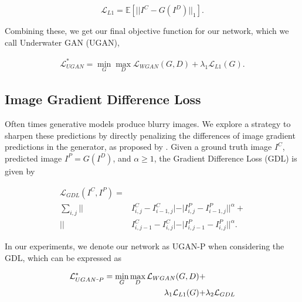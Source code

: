 \begin{equation}
   \mathcal{L}_{L1} = \mathbb{E} [ || I^C - G(I^D) ||_1 ].
\end{equation}

\noindent Combining these, we get our final objective function for our network, which we call Underwater GAN (UGAN),

\begin{equation}
   \begin{aligned}
      \mathcal{L}_{UGAN}^* = \min\limits_{G}\max\limits_{D} \mathcal{L}_{WGAN}(G,D) + \lambda_{1} \mathcal{L}_{L1}(G).
   \end{aligned}
\end{equation}


\subsection{Image Gradient Difference Loss}
Often times generative models produce blurry images. We explore a strategy to sharpen these predictions by
directly penalizing the differences of image gradient predictions in the generator, as proposed by
\cite{mathieu2015deep}. Given a ground truth image $I^C$, predicted image $I^P = G(I^D)$, and $\alpha \geq 1$, the
Gradient Difference Loss (GDL) is given by

\begin{equation}
   \begin{aligned}
      \mathcal{L}_{GDL}(I^C, I^P) = \\ \sum\limits_{i,j} || & I^C_{i,j} - I^C_{i-1,j}| - | I^P_{i,j} - I^P_{i-1,j}||^{\alpha} + \\
      || & I^C_{i,j-1} - I^C_{i,j}| - | I^P_{i,j-1} - I^P_{i,j}||^{\alpha}.
   \end{aligned}
   \label{gdl_eq}
\end{equation}

\noindent In our experiments, we denote our network as UGAN-P when considering the GDL, which can be expressed as

\begin{equation}
   \begin{aligned}
      \mathcal{L}_{UGAN\scalebox{0.4}[1.0]{\( - \)}P}^* = \min\limits_{G}\max\limits_{D} \mathcal{L}_{WGAN}(G,D) + & \\
      \lambda_{1} \mathcal{L}_{L1}(G) + & \lambda_{2} \mathcal{L}_{GDL}
   \end{aligned}
\end{equation}


